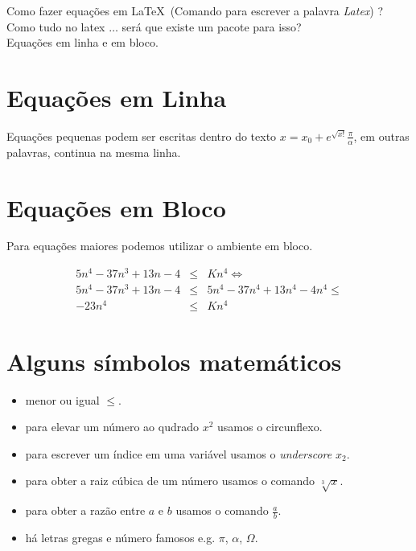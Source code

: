\documentclass[12pt, a4paper]{article}
\begin{document}
Como fazer equações em \LaTeX\ (Comando para escrever a palavra \emph{Latex}) ?\\
Como tudo no latex $\ldots$ será que existe um pacote para isso? 		\\
Equações em linha e em bloco.

\section{Equações em Linha}
Equações pequenas podem ser escritas dentro do texto $x = x_{0} + e^{\sqrt{x!}}\frac{\pi}{\alpha}$, em outras palavras, continua na mesma linha.

\section{Equações em Bloco}
Para equações maiores podemos utilizar o ambiente em bloco.

\begin{eqnarray}
\nonumber 5n^{4} - 37n^{3} + 13n - 4 &\leq& Kn^{4} \Leftrightarrow \\
5n^{4} - 37n^{3} + 13n - 4 &\leq& 5n^{4} - 37n^{4} + 13n^{4} -4n^{4} \leq  \\
\nonumber -23n^{4} &\leq&  Kn^{4}
\end{eqnarray}

\section{Alguns símbolos matemáticos}
\begin{itemize}
\item menor ou igual $\leq$.
\item para elevar um número ao qudrado $x^{2}$ usamos o circunflexo.
\item para escrever um índice em uma variável usamos o \emph{underscore} $x_{2}$.
\item para obter a raiz cúbica de um número usamos o comando $\sqrt[3]{x}$.
\item para obter a razão entre $a$ e $b$ usamos o comando $\frac{a}{b}$.
\item há letras gregas e número famosos e.g. $\pi$, $\alpha$, $\Omega$.
\end{itemize}


\end{document}

